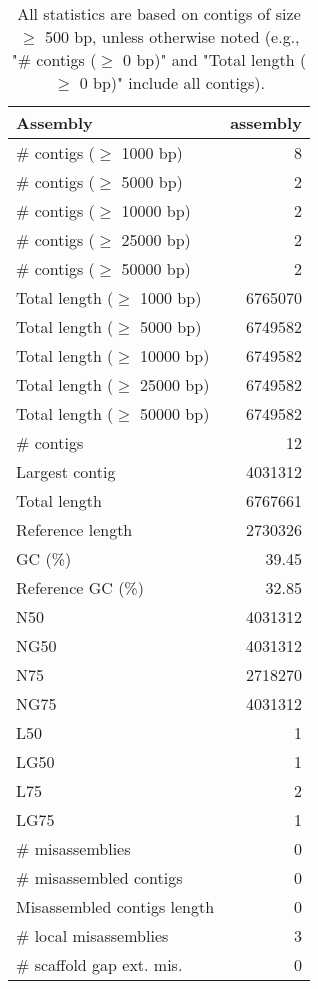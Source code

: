 \documentclass[12pt,a4paper]{article}
\begin{document}
\begin{table}[ht]
\begin{center}
\caption{All statistics are based on contigs of size $\geq$ 500 bp, unless otherwise noted (e.g., "\# contigs ($\geq$ 0 bp)" and "Total length ($\geq$ 0 bp)" include all contigs).}
\begin{tabular}{|l*{1}{|r}|}
\hline
Assembly & assembly \\ \hline
\# contigs ($\geq$ 1000 bp) & 8 \\ \hline
\# contigs ($\geq$ 5000 bp) & 2 \\ \hline
\# contigs ($\geq$ 10000 bp) & 2 \\ \hline
\# contigs ($\geq$ 25000 bp) & 2 \\ \hline
\# contigs ($\geq$ 50000 bp) & 2 \\ \hline
Total length ($\geq$ 1000 bp) & 6765070 \\ \hline
Total length ($\geq$ 5000 bp) & 6749582 \\ \hline
Total length ($\geq$ 10000 bp) & 6749582 \\ \hline
Total length ($\geq$ 25000 bp) & 6749582 \\ \hline
Total length ($\geq$ 50000 bp) & 6749582 \\ \hline
\# contigs & 12 \\ \hline
Largest contig & 4031312 \\ \hline
Total length & 6767661 \\ \hline
Reference length & 2730326 \\ \hline
GC (\%) & 39.45 \\ \hline
Reference GC (\%) & 32.85 \\ \hline
N50 & 4031312 \\ \hline
NG50 & 4031312 \\ \hline
N75 & 2718270 \\ \hline
NG75 & 4031312 \\ \hline
L50 & 1 \\ \hline
LG50 & 1 \\ \hline
L75 & 2 \\ \hline
LG75 & 1 \\ \hline
\# misassemblies & 0 \\ \hline
\# misassembled contigs & 0 \\ \hline
Misassembled contigs length & 0 \\ \hline
\# local misassemblies & 3 \\ \hline
\# scaffold gap ext. mis. & 0 \\ \hline

\end{tabular}
\end{center}
\end{table}
\end{document}
